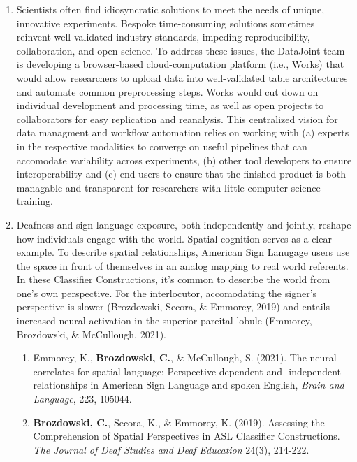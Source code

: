 \documentclass{nihbiosketch}
\begin{document}
\begin{enumerate}
\item Scientists often find idiosyncratic solutions to meet the needs of unique,
innovative experiments. Bespoke time-consuming solutions sometimes reinvent
well-validated industry standards, impeding reproducibility, collaboration, and open
science. To address these issues, the DataJoint team is developing a browser-based
cloud-computation platform (i.e., Works) that would allow researchers to upload data
into well-validated table architectures and automate common preprocessing steps. Works
would cut down on individual development and processing time, as well as open projects
to collaborators for easy replication and reanalysis. This centralized vision for data
managment and workflow automation relies on working with (a) experts in the respective
modalities to converge on useful pipelines that can accomodate variability across
experiments, (b) other tool developers to ensure interoperability and (c) end-users to
ensure that the finished product is both managable and transparent for researchers with
little computer science training.

\item Deafness and sign language exposure, both independently and jointly, reshape how
 individuals engage with the world. Spatial cognition serves as a clear example. To
 describe spatial relationships, American Sign Lanugage users use the space in front of
 themselves in an analog mapping to real world referents. In these Classifier
 Constructions, it's common to describe the world from one's own perspective. For the
 interlocutor, accomodating the signer's perspective is slower (Brozdowski, Secora, \&
 Emmorey, 2019) and entails increased neural activation in the superior pareital
 lobule (Emmorey, Brozdowski, \& McCullough, 2021).

\begin{enumerate}

\item Emmorey, K., \textbf{Brozdowski, C.}, \& McCullough, S. (2021). The neural
        correlates for spatial language: Perspective-dependent and -independent
        relationships in American Sign Language and spoken English,
        \textit{Brain and Language}, 223, 105044.

\item \textbf{Brozdowski, C.}, Secora, K., \& Emmorey, K. (2019). Assessing the
        Comprehension of Spatial Perspectives in ASL Classifier Constructions.
        \textit{The Journal of Deaf Studies and Deaf Education} 24(3), 214-222.


\end{enumerate}
\end{enumerate}
\end{document}
